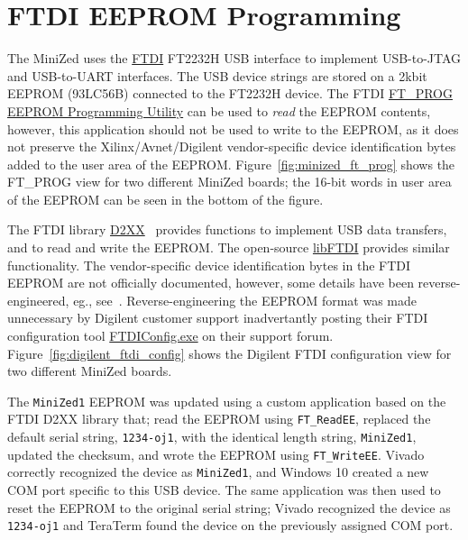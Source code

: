 \section{FTDI EEPROM Programming}
\label{sec:ftdi_eeprom}

The MiniZed uses the \href{https://ftdichip.com}{FTDI} FT2232H USB interface to 
implement USB-to-JTAG and USB-to-UART interfaces. The USB device strings are
stored on a 2kbit EEPROM (93LC56B) connected to the FT2232H device. The 
FTDI \href{https://ftdichip.com/utilities}{FT\_PROG EEPROM Programming 
Utility} can be used to \emph{read} the EEPROM contents, however, this
application should not be used to write to the EEPROM, as it does not preserve
the Xilinx/Avnet/Digilent vendor-specific device identification bytes added to the 
user area of the EEPROM. Figure~\ref{fig:minized_ft_prog} shows the FT\_PROG
view for two different MiniZed boards; the 16-bit words in user area 
of the EEPROM can be seen in the bottom of the figure. 

The FTDI library 
\href{https://ftdichip.com/drivers/d2xx-drivers}{D2XX}~\cite{FTDI_D2XX_2019}
provides functions to implement USB data transfers, and to read and write
the EEPROM.
%
The open-source \href{https://www.intra2net.com/en/developer/libftdi}{libFTDI}
provides similar functionality.
%
%
The vendor-specific device identification bytes in the FTDI
EEPROM are not officially documented, however, some details have been
reverse-engineered, eg., see~\cite{Bartik_2019}.
%
Reverse-engineering the EEPROM format was made unnecessary by Digilent 
customer support inadvertantly posting their FTDI configuration tool 
\href{https://forum.digilentinc.com/topic/1816-digilent-smt1-recovery}
{FTDIConfig.exe} on their support forum.
Figure~\ref{fig:digilent_ftdi_config} shows the Digilent FTDI configuration
view for two different MiniZed boards.

The \texttt{MiniZed1} EEPROM was updated using a custom application based
on the FTDI D2XX library that;
%
read the EEPROM using \texttt{FT\_ReadEE},
replaced the default serial string, \texttt{1234-oj1}, 
with the identical length string, \texttt{MiniZed1},
updated the checksum,
and wrote the EEPROM using \texttt{FT\_WriteEE}. 
%
Vivado correctly recognized the device as \texttt{MiniZed1}, and Windows 
10 created a new COM port specific to this USB device. The same application 
was then used to reset the EEPROM to the original serial string; Vivado 
recognized the device as \texttt{1234-oj1} and TeraTerm found the device 
on the previously assigned COM port. 

